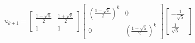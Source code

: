 \documentclass[preview]{standalone}
\begin{document}
\begin{center}
$$u_{k + 1} = \begin{bmatrix} \frac{1 - \sqrt{5}}{2} & \frac{1 + \sqrt{5}}{2} \\ 1 & 1 \end{bmatrix} \begin{bmatrix} (\frac{1 - \sqrt{5}}{2})^k &  0 \\ 0 & (\frac{1 + \sqrt{5}}{2})^k \end{bmatrix}  \begin{bmatrix} -\frac{1}{\sqrt{5}} \\ \frac{1}{\sqrt{5}} \end{bmatrix}$$
\end{center}
\end{document}
